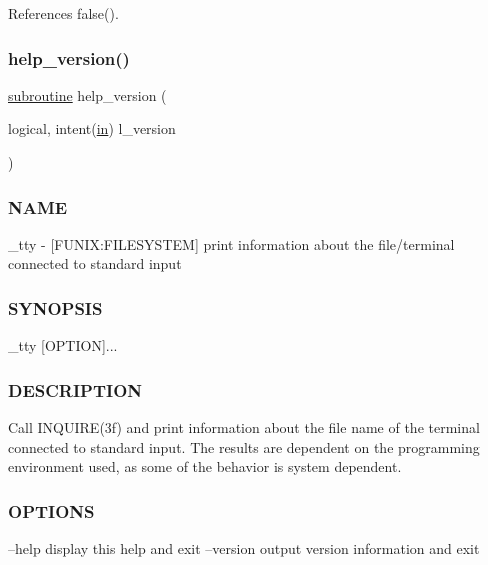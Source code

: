 References false().

\mbox{\label{__tty_8f90_a39c21619b08a3c22f19e2306efd7f766}} 
\subsubsection{\texorpdfstring{help\+\_\+version()}{help\_version()}}
{\footnotesize\ttfamily \hyperlink{M__stopwatch_83_8txt_acfbcff50169d691ff02d4a123ed70482}{subroutine} help\+\_\+version (\begin{DoxyParamCaption}\item[{logical, intent(\hyperlink{M__journal_83_8txt_afce72651d1eed785a2132bee863b2f38}{in})}]{l\+\_\+version }\end{DoxyParamCaption})}



\subsubsection*{N\+A\+ME}

\+\_\+tty -\/ \mbox{[}F\+U\+N\+IX\+:F\+I\+L\+E\+S\+Y\+S\+T\+EM\mbox{]} print information about the file/terminal connected to standard input 

\subsubsection*{S\+Y\+N\+O\+P\+S\+IS}

\begin{DoxyVerb}    _tty [OPTION]...
\end{DoxyVerb}
 \subsubsection*{D\+E\+S\+C\+R\+I\+P\+T\+I\+ON}

Call I\+N\+Q\+U\+I\+R\+E(3f) and print information about the file name of the terminal connected to standard input. The results are dependent on the programming environment used, as some of the behavior is system dependent. \subsubsection*{O\+P\+T\+I\+O\+NS}

--help display this help and exit --version output version information and exit

